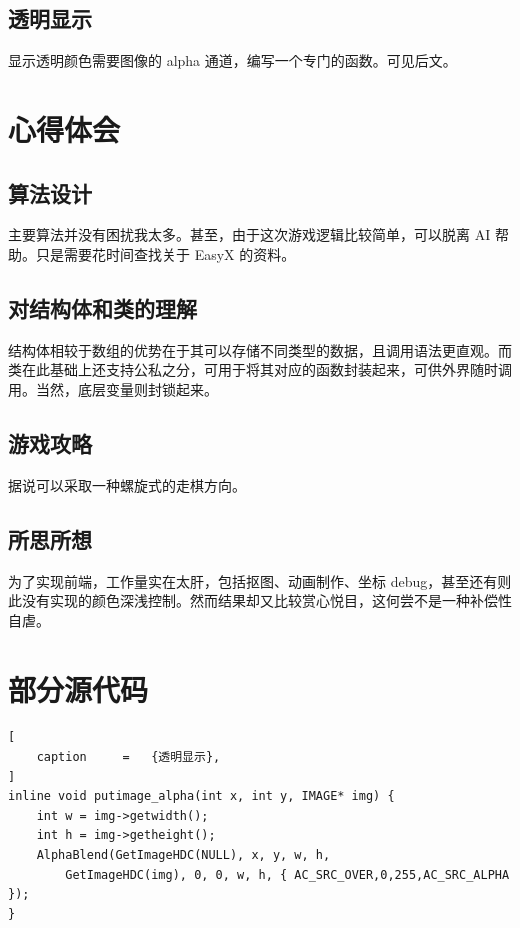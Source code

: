 \documentclass[12pt,a4paper,twoside]{ctexart}
\numberwithin{figure}{section}
\numberwithin{equation}{section}
\begin{document}
\subsection{透明显示}
显示透明颜色需要图像的 alpha 通道，编写一个专门的函数。可见后文。

\newpage
\section{心得体会}

\subsection{算法设计}
主要算法并没有困扰我太多。甚至，由于这次游戏逻辑比较简单，可以脱离 AI 帮助。只是需要花时间查找关于 EasyX 的资料。


\subsection{对结构体和类的理解}
结构体相较于数组的优势在于其可以存储不同类型的数据，且调用语法更直观。而类在此基础上还支持公私之分，可用于将其对应的函数封装起来，可供外界随时调用。当然，底层变量则封锁起来。

\subsection{游戏攻略}
据说可以采取一种螺旋式的走棋方向。

\subsection{所思所想}
为了实现前端，工作量实在太肝，包括抠图、动画制作、坐标 debug，甚至还有则此没有实现的颜色深浅控制。然而结果却又比较赏心悦目，这何尝不是一种补偿性自虐。

\newpage
\section{部分源代码}

\begin{lstlisting}[
    caption     =   {透明显示},
]
inline void putimage_alpha(int x, int y, IMAGE* img) {
	int w = img->getwidth();
	int h = img->getheight();
	AlphaBlend(GetImageHDC(NULL), x, y, w, h,
		GetImageHDC(img), 0, 0, w, h, { AC_SRC_OVER,0,255,AC_SRC_ALPHA });
}
\end{lstlisting}
\end{document}
